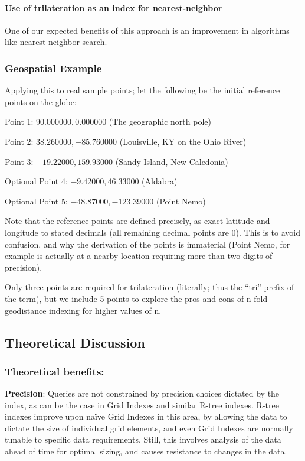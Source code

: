\documentclass[]{article}
\let\oldparagraph\paragraph
\renewcommand{\paragraph}[1]{\oldparagraph{#1}\mbox{}}
\begin{document}
\paragraph{Use of trilateration as an index for
nearest-neighbor}\label{use-of-trilateration-as-an-index-for-nearest-neighbor}

One of our expected benefits of this approach is an improvement in
algorithms like nearest-neighbor search.

\subsubsection{Geospatial Example}\label{geospatial-example}

Applying this to real sample points; let the following be the initial
reference points on the globe:

Point 1: \(90.000000, 0.000000\) (The geographic north pole)

Point 2: \(38.260000, -85.760000\) (Louisville, KY on the Ohio River)

Point 3: \(-19.22000, 159.93000\) (Sandy Island, New Caledonia)

Optional Point 4: \(-9.42000, 46.33000\) (Aldabra)

Optional Point 5: \(-48.87000, -123.39000\) (Point Nemo)

Note that the reference points are defined precisely, as exact latitude
and longitude to stated decimals (all remaining decimal points are 0).
This is to avoid confusion, and why the derivation of the points is
immaterial (Point Nemo, for example is actually at a nearby location
requiring more than two digits of precision).

Only three points are required for trilateration (literally; thus the
``tri'' prefix of the term), but we include 5 points to explore the pros
and cons of n-fold geodistance indexing for higher values of n.

\subsection{Theoretical Discussion}\label{theoretical-discussion}

\subsubsection{Theoretical benefits:}\label{theoretical-benefits}

\textbf{Precision}: Queries are not constrained by precision choices
dictated by the index, as can be the case in Grid Indexes and similar
R-tree indexes. R-tree indexes improve upon naïve Grid Indexes in this
area, by allowing the data to dictate the size of individual grid
elements, and even Grid Indexes are normally tunable to specific data
requirements. Still, this involves analysis of the data ahead of time
for optimal sizing, and causes resistance to changes in the data.
\end{document}
